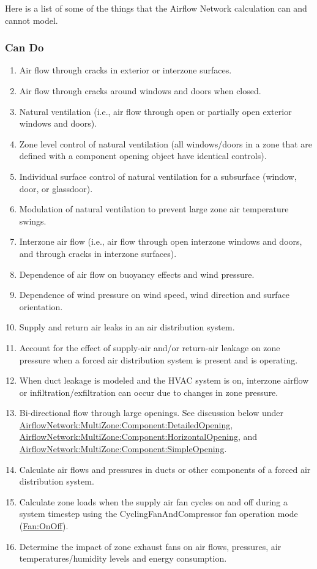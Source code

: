 Here is a list of some of the things that the Airflow Network calculation can and cannot model.

\subsubsection{Can Do}\label{can-do}
\begin{enumerate}
\item Air flow through cracks in exterior or interzone surfaces.
\item Air flow through cracks around windows and doors when closed.
\item Natural ventilation (i.e., air flow through open or partially open exterior windows and doors).
\item Zone level control of natural ventilation (all windows/doors in a zone that are defined with a component opening object have identical controls).
\item Individual surface control of natural ventilation for a subsurface (window, door, or glassdoor).
\item Modulation of natural ventilation to prevent large zone air temperature swings.
\item Interzone air flow (i.e., air flow through open interzone windows and doors, and through cracks in interzone surfaces).
\item Dependence of air flow on buoyancy effects and wind pressure.
\item Dependence of wind pressure on wind speed, wind direction and surface orientation.
\item Supply and return air leaks in an air distribution system.
\item Account for the effect of supply-air and/or return-air leakage on zone pressure when a forced air distribution system is present and is operating.
\item When duct leakage is modeled and the HVAC system is on, interzone airflow or infiltration/exfiltration can occur due to changes in zone pressure.
\item Bi-directional flow through large openings. See discussion below under \hyperref[airflownetworkmultizonecomponentdetailedopening]{AirflowNetwork:MultiZone:Component:DetailedOpening}, \hyperref[airflownetworkmultizonecomponenthorizontalopening]{AirflowNetwork:MultiZone:Component:HorizontalOpening}, and \hyperref[airflownetworkmultizonecomponentsimpleopening]{AirflowNetwork:MultiZone:Component:SimpleOpening}.
\item Calculate air flows and pressures in ducts or other components of a forced air distribution system.
\item Calculate zone loads when the supply air fan cycles on and off during a system timestep using the CyclingFanAndCompressor fan operation mode (\hyperref[fanonoff]{Fan:OnOff}).
\item Determine the impact of zone exhaust fans on air flows, pressures, air temperatures/humidity levels and energy consumption.
\end{enumerate}

